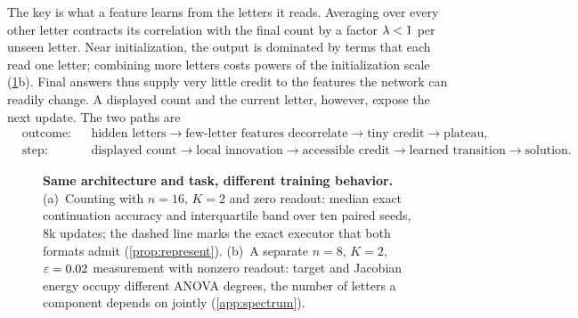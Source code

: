 The key is what a feature learns from the letters it reads. Averaging over every other letter contracts its correlation with the
final count by a factor $\lambda<1$ per unseen letter. Near initialization, the output is dominated by terms that each read one letter;
combining more letters costs powers of the initialization scale (\cref{fig:overview}b). Final answers thus supply very little credit
to the features the network can readily change. A displayed count and the current letter, however, expose the next update. The two paths are
{\small
\[
\begin{aligned}
 &\text{outcome:}&&\text{hidden letters}\to\text{few-letter features decorrelate}\to\text{tiny credit}\to\text{plateau},\\
 &\text{step:}&&\text{displayed count}\to\text{local innovation}\to\text{accessible credit}\to\text{learned transition}\to\text{solution}.
\end{aligned}
\]
}

\begin{figure}[t]
\centering

\caption{\textbf{Same architecture and task, different training behavior.}
(a)~Counting with $n=16$, $K=2$ and zero readout: median exact continuation accuracy and interquartile band over ten paired seeds, $8$k
updates; the dashed line marks the exact executor that both formats admit (\cref{prop:represent}).
(b)~A separate $n=8$, $K=2$, $\varepsilon=0.02$ measurement with nonzero readout: target and Jacobian energy occupy different ANOVA degrees, the number of letters a component depends on jointly (\cref{app:spectrum}).}
\label{fig:overview}
\end{figure}

